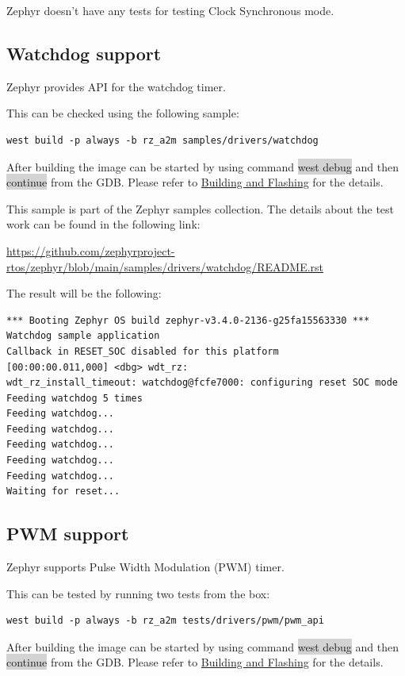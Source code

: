 \documentclass[11pt,a4paper,oneside]{article}
\begin{document}
Zephyr doesn't have any tests for testing Clock Synchronous mode.

\subsection{Watchdog support}\label{watchdog-support}

Zephyr provides API for the watchdog timer.

This can be checked using the following sample:

\begin{lstlisting}
west build -p always -b rz_a2m samples/drivers/watchdog
\end{lstlisting}

After building the image can be started by using command \colorbox{lightgray}{west debug}
and then \colorbox{lightgray}{continue} from the GDB. Please refer to
\hyperref[building-and-flashing]{Building and Flashing} for the
details.

This sample is part of the Zephyr samples collection. The details about
the test work can be found in the following link:

\url{https://github.com/zephyrproject-rtos/zephyr/blob/main/samples/drivers/watchdog/README.rst}

The result will be the following:

\begin{lstlisting}
*** Booting Zephyr OS build zephyr-v3.4.0-2136-g25fa15563330 ***
Watchdog sample application
Callback in RESET_SOC disabled for this platform
[00:00:00.011,000] <dbg> wdt_rz:
wdt_rz_install_timeout: watchdog@fcfe7000: configuring reset SOC mode
Feeding watchdog 5 times
Feeding watchdog...
Feeding watchdog...
Feeding watchdog...
Feeding watchdog...
Feeding watchdog...
Waiting for reset...
\end{lstlisting}

\subsection{PWM support}\label{pwm-support}

Zephyr supports Pulse Width Modulation (PWM) timer.

This can be tested by running two tests from the box:

\begin{lstlisting}
west build -p always -b rz_a2m tests/drivers/pwm/pwm_api
\end{lstlisting}

After building the image can be started by using command \colorbox{lightgray}{west debug}
and then \colorbox{lightgray}{continue} from the GDB. Please refer to
\hyperref[building-and-flashing]{Building and Flashing} for the
details.
\end{document}
